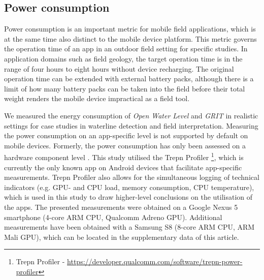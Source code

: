 \documentclass[review]{elsarticle}
\begin{document}
%

\subsection{Power consumption}
\label{sec:technology:power}

Power consumption is an important metric for mobile field applications, which is at the same time also distinct to the mobile device platform. This metric governs the operation time of an app in an outdoor field setting for specific studies. In application domains such as field geology, the target operation time is in the range of four hours to eight hours without device recharging. The original operation time can be extended with external battery packs, although there is a limit of how many battery packs can be taken into the field before their total weight renders the mobile device impractical as a field tool.

We measured the energy consumption of \textit{Open Water Level} and \textit{\gls{GRIT}} in realistic settings for case studies in waterline detection and field interpretation. Measuring the power consumption on an app-specific level is not supported by default on mobile devices. Formerly, the power consumption has only been assessed on a hardware component level \cite{Carroll2010}. This study utilised the Trepn Profiler \footnote{Trepn Profiler - \url{https://developer.qualcomm.com/software/trepn-power-profiler}}, which is currently the only known app on Android devices that facilitate app-specific measurements. Trepn Profiler also allows for the simultaneous logging of technical indicators (e.g. \gls{GPU}- and \gls{CPU} load, memory consumption, \gls{CPU} temperature), which is used in this study to draw higher-level conclusions on the utilisation of the apps. The presented measurements were obtained on a Google Nexus 5 smartphone (4-core ARM \gls{CPU}, Qualcomm Adreno \gls{GPU}). Additional measurements have been obtained with a Samsung S8 (8-core ARM \gls{CPU}, ARM Mali \gls{GPU}), which can be located in the supplementary data of this article.
\end{document}
